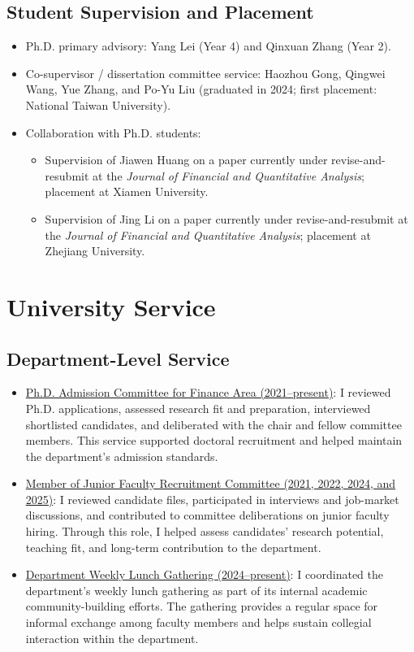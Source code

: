 \documentclass[11pt]{article}
\begin{document}
\subsection{Student Supervision and Placement}
\begin{itemize}
\item Ph.D. primary advisory: Yang Lei (Year 4) and Qinxuan Zhang (Year 2).
\item Co-supervisor / dissertation committee service: Haozhou Gong, Qingwei Wang, Yue Zhang, and Po-Yu Liu (graduated in 2024; first placement: National Taiwan University).
\item Collaboration with Ph.D. students:
\begin{itemize}
\item Supervision of Jiawen Huang on a paper currently under revise-and-resubmit at the \textcolor{blue!70!black}{\emph{Journal of Financial and Quantitative Analysis}}; placement at Xiamen University.
\item Supervision of Jing Li on a paper currently under revise-and-resubmit at the \textcolor{blue!70!black}{\emph{Journal of Financial and Quantitative Analysis}}; placement at Zhejiang University.
\end{itemize}
\end{itemize}

\section{University Service}
\subsection{Department-Level Service}
\begin{itemize}
\item \underline{Ph.D. Admission Committee for Finance Area (2021--present)}: I reviewed Ph.D. applications, assessed research fit and preparation, interviewed shortlisted candidates, and deliberated with the chair and fellow committee members. This service supported doctoral recruitment and helped maintain the department's admission standards.
\item \underline{Member of Junior Faculty Recruitment Committee (2021, 2022, 2024, and 2025)}: I reviewed candidate files, participated in interviews and job-market discussions, and contributed to committee deliberations on junior faculty hiring. Through this role, I helped assess candidates' research potential, teaching fit, and long-term contribution to the department.
\item \underline{Department Weekly Lunch Gathering (2024--present)}: I coordinated the department's weekly lunch gathering as part of its internal academic community-building efforts. The gathering provides a regular space for informal exchange among faculty members and helps sustain collegial interaction within the department.
\end{itemize}
\end{document}
